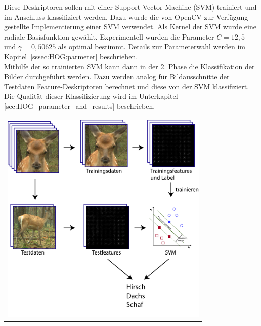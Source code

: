 Diese Deskriptoren sollen mit einer Support Vector Machine (SVM) trainiert und im Anschluss klassifiziert werden. Dazu wurde die von OpenCV zur Verfügung gestellte Implementierung einer SVM verwendet. Als Kernel der SVM wurde eine radiale Basisfunktion gewählt. Experimentell wurden die Parameter $C = 12,5$ und $\gamma = 0,50625$ als optimal bestimmt. Details zur Parameterwahl werden im Kapitel~\ref{sssec:HOG:parmeter} beschrieben.\\
Mithilfe der so trainierten SVM kann dann in der 2. Phase die Klassifikation der Bilder durchgeführt werden. Dazu werden analog für Bildausschnitte der Testdaten Feature-Deskriptoren berechnet und diese von der SVM klassifiziert. Die Qualität dieser Klassifizierung wird im Unterkapitel \ref{sec:HOG_parameter_and_results} beschrieben.
\begin{center}
\begin{tabular}{c}
\includegraphics[trim={0 0cm 0cm 0cm},clip=true,width=10cm]{img/ClassificationOverview.png}
\end{tabular}
\label{fig:hog_classification_ov}
\end{center}
